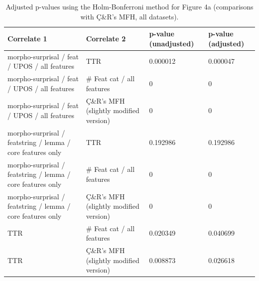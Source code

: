 \documentclass[USenglish]{article}
\begin{document}
\begin{table}[ht]
    \centering
    \caption{Adjusted p-values using the Holm-Bonferroni method \citep{holm_simple_1979} for Figure 4a
    (comparisons with Ç\&R’s MFH, all datasets). } %
    \label{tab:p_values_adjusted_cr_all}   
    \begin{tabular}{p{3.1cm}p{3.1cm}p{2.4cm}p{2.4cm}}
\toprule
	\textbf{Correlate 1}	&	\textbf{Correlate 2}& \textbf{p-value \newline(unadjusted)}    &	\textbf{p-value \newline(adjusted)}	\\
    \midrule
morpho-surprisal /   feat /   UPOS /   all features	&	TTR	&	0.000012 &	0.000047
	\\ \midrule
morpho-surprisal /   feat /   UPOS /   all features	&	\# Feat cat /   all features	&	0	&	0	\\ \midrule
morpho-surprisal /   feat /   UPOS /   all features	&	Ç\&R's MFH (slightly modified version)	&	0	&	0	\\ \midrule
morpho-surprisal /   featstring  /    lemma /   core features only	&	TTR	&	0.192986	&0.192986	\\ \midrule
morpho-surprisal /   featstring  /    lemma /   core features only	&	\# Feat cat /   all features	&	0	&	0	\\ \midrule
morpho-surprisal /   featstring  /    lemma /   core features only	&	Ç\&R's MFH (slightly modified version)	&	0	&	0	\\ \midrule
TTR	&	\# Feat cat /   all features	&	0.020349	&0.040699	\\ \midrule
TTR	&	Ç\&R's MFH (slightly modified version)	&	0.008873 &	0.026618
	\\ \bottomrule
    
\end{tabular}
\end{table}
\end{document}

